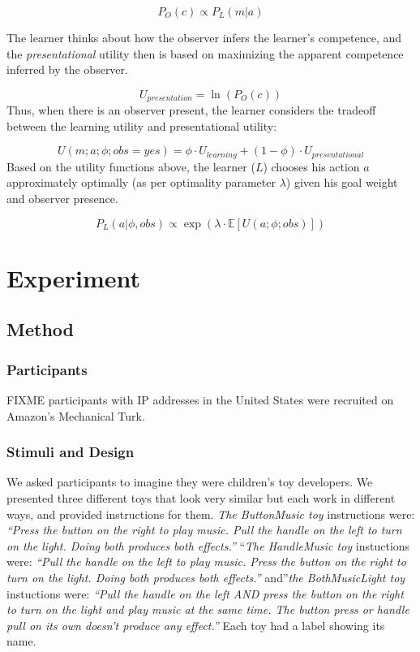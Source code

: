 \documentclass[10pt, letterpaper]{article}
\begin{document}
\[ P_O(c) \propto P_L(m | a)\]

The learner thinks about how the observer infers the learner's
competence, and the \emph{presentational} utility then is based on
maximizing the apparent competence inferred by the observer.

\[ U_{presentation} = \ln(P_O(c)) \] Thus, when there is an observer
present, the learner considers the tradeoff between the learning utility
and presentational utility:

\[ U(m;a;\phi; obs = yes) = \phi \cdot U_{learning} + (1-\phi) \cdot U_{presentational}\]
Based on the utility functions above, the learner (\(L\)) chooses his
action \(a\) approximately optimally (as per optimality parameter
\(\lambda\)) given his goal weight and observer presence.

\[ P_L(a | \phi, obs) \propto \exp(\lambda \cdot \mathbb{E}[U(a;\phi; obs)])\]

\section{Experiment}\label{experiment}

\subsection{Method}\label{method}

\subsubsection{Participants}\label{participants}

FIXME participants with IP addresses in the United States were recruited
on Amazon's Mechanical Turk.

\subsubsection{Stimuli and Design}\label{stimuli-and-design}

We asked participants to imagine they were children's toy developers. We
presented three different toys that look very similar but each work in
different ways, and provided instructions for them. \emph{The
ButtonMusic toy} instructions were: \emph{``Press the button on the
right to play music. Pull the handle on the left to turn on the light.
Doing both produces both effects.''} ``\emph{The HandleMusic toy}
instuctions were: \emph{``Pull the handle on the left to play music.
Press the button on the right to turn on the light. Doing both produces
both effects.''} and''\emph{the BothMusicLight toy} instuctions were:
\emph{``Pull the handle on the left AND press the button on the right to
turn on the light and play music at the same time. The button press or
handle pull on its own doesn't produce any effect.''} Each toy had a
label showing its name.
\end{document}
